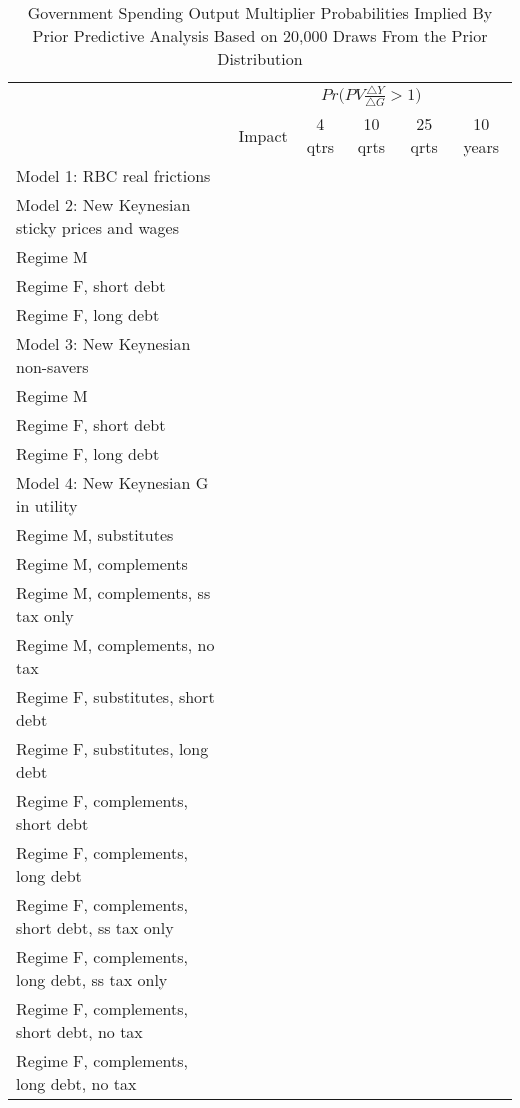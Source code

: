 \documentclass[letterpaper,12pt]{article}%
\begin{document}
\begin{table}[H]
    \centering
    \caption{Government Spending Output Multiplier Probabilities Implied By Prior Predictive Analysis Based on 20,000 Draws From the Prior Distribution}
    \begin{tabular}{l c c c c c}
    \toprule
        & \multicolumn{5}{c}{$Pr\Big(PV \frac{\triangle Y}{\triangle G}>1\Big)$}\\
      \cmidrule{2-6}
        & Impact & 4 qtrs & 10 qrts & 25 qrts & 10 years \\
       \midrule
     Model 1: RBC real frictions &    &   &   &   &  \\
     Model 2: New Keynesian sticky prices and wages    &    &   &   &   &  \\
     \quad Regime M &    &   &   &   &  \\
     \quad Regime F, short debt &    &   &   &   &  \\
     \quad Regime F, long debt &    &   &   &   &  \\
     Model 3: New Keynesian non-savers &    &   &   &   &  \\
     \quad Regime M &    &   &   &   &  \\
     \quad Regime F, short debt &    &   &   &   &  \\
     \quad Regime F, long debt &    &   &   &   &  \\
     Model 4: New Keynesian G in utility &    &   &   &   &  \\
     \quad Regime M, substitutes &    &   &   &   &  \\
     \quad Regime M, complements &    &   &   &   &  \\
     \quad Regime M, complements, ss tax only &    &   &   &   &  \\
     \quad Regime M, complements, no tax &    &   &   &   &  \\
     \quad Regime F, substitutes, short debt &    &   &   &   &  \\
     \quad Regime F, substitutes, long debt &    &   &   &   &  \\
     \quad Regime F, complements, short debt &    &   &   &   &  \\
     \quad Regime F, complements, long debt &    &   &   &   &  \\
     \quad Regime F, complements, short debt, ss tax only &    &   &   &   &  \\
     \quad Regime F, complements, long debt, ss tax only &    &   &   &   &  \\
     \quad Regime F, complements, short debt, no tax &    &   &   &   &  \\
     \quad Regime F, complements, long debt, no tax &    &   &   &   &  \\
     \midrule
    \bottomrule    
    \end{tabular}
    \label{tab:PPAOutputMultipliers}
\end{table}
\end{document}
